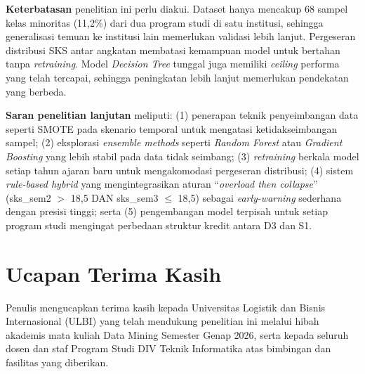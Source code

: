 \documentclass{ieeeaccess}
\begin{document}
\textbf{Keterbatasan} penelitian ini perlu diakui. Dataset hanya mencakup 68 sampel kelas minoritas (11,2\%) dari dua program studi di satu institusi, sehingga generalisasi temuan ke institusi lain memerlukan validasi lebih lanjut. Pergeseran distribusi SKS antar angkatan membatasi kemampuan model untuk bertahan tanpa \emph{retraining}. Model \emph{Decision Tree} tunggal juga memiliki \emph{ceiling} performa yang telah tercapai, sehingga peningkatan lebih lanjut memerlukan pendekatan yang berbeda.

\textbf{Saran penelitian lanjutan} meliputi: (1) penerapan teknik penyeimbangan data seperti SMOTE pada skenario temporal untuk mengatasi ketidakseimbangan sampel; (2) eksplorasi \emph{ensemble methods} seperti \emph{Random Forest} atau \emph{Gradient Boosting} yang lebih stabil pada data tidak seimbang; (3) \emph{retraining} berkala model setiap tahun ajaran baru untuk mengakomodasi pergeseran distribusi; (4) sistem \emph{rule-based hybrid} yang mengintegrasikan aturan ``\emph{overload then collapse}'' (sks\_sem2 $>$ 18,5 DAN sks\_sem3 $\le$ 18,5) sebagai \emph{early-warning} sederhana dengan presisi tinggi; serta (5) pengembangan model terpisah untuk setiap program studi mengingat perbedaan struktur kredit antara D3 dan S1.

\section*{Ucapan Terima Kasih}
Penulis mengucapkan terima kasih kepada Universitas Logistik dan Bisnis Internasional (ULBI) yang telah mendukung penelitian ini melalui hibah akademis mata kuliah Data Mining Semester Genap 2026, serta kepada seluruh dosen dan staf Program Studi DIV Teknik Informatika atas bimbingan dan fasilitas yang diberikan.
\end{document}
